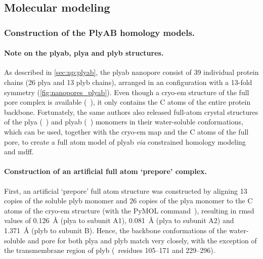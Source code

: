 \subsection{Molecular modeling}
%
\label{sec:elec:methods:molec}

\subsubsection{Construction of the PlyAB homology models.}
%

\paragraph{Note on the \gls{plyab}, \gls{plya} and \gls{plyb} structures.}
%
As described in \cref{sec:np:plyab}, the \Gls{plyab} nanopore consist of 39 individual protein chains (26
\gls{plya} and 13 \gls{plyb} chains), arranged in an  configuration with a 13-fold symmetry
(\cref{fig:nanopores_plyab}). Even though a \gls{cryo-em} structure of the full pore complex is available
(~\cite{Lukoyanova-Kondos-2015}), it only contains the C\ta{} atoms of the entire protein
backbone. Fortunately, the same authors also released full-atom crystal structures of the \gls{plya}
(~\cite{Lukoyanova-Kondos-2015}) and \gls{plyab} (~\cite{Lukoyanova-Kondos-2015})
monomers in their water-soluble conformations, which can be used, together with the \gls{cryo-em} map and the
C\ta{} atoms of the full pore, to create a full atom model of \gls{plyab} \textit{via} constrained homology
modeling and \gls{mdff}.

\paragraph{Construction of an artificial full atom `prepore' complex.}
%
First, an artificial `prepore' full atom structure was constructed by aligning 13 copies of the soluble
\gls{plyb} monomer and 26 copies of the \gls{plya} monomer to the C\ta{} atoms of the \gls{cryo-em} structure
(with the PyMOL  command~\cite{PyMOL}), resulting in \gls{rmsd} values of \SI{0.126}{\angstrom}
(\gls{plya} to subunit A1), \SI{0.081}{\angstrom} (\gls{plya} to subunit A2) and \SI{1.371}{\angstrom}
(\gls{plyb} to subunit B). Hence, the backbone conformations of the water-soluble and pore for both \gls{plya}
and \gls{plyb} match very closely, with the exception of the transmembrane region of \gls{plyb} (\ie~residues
\numrange{105}{171} and \numrange{229}{296}).

